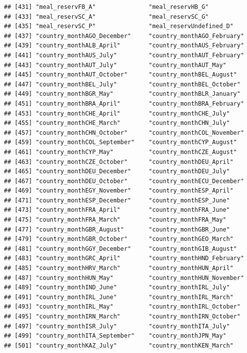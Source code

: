 \documentclass[
]{article}
\begin{document}
\begin{verbatim}
## [431] "meal_reservFB_A"               "meal_reservHB_G"              
## [433] "meal_reservSC_A"               "meal_reservSC_G"              
## [435] "meal_reservSC_P"               "meal_reservUndefined_D"       
## [437] "country_monthAGO_December"     "country_monthAGO_February"    
## [439] "country_monthALB_April"        "country_monthAUS_February"    
## [441] "country_monthAUS_July"         "country_monthAUT_February"    
## [443] "country_monthAUT_July"         "country_monthAUT_May"         
## [445] "country_monthAUT_October"      "country_monthBEL_August"      
## [447] "country_monthBEL_July"         "country_monthBEL_October"     
## [449] "country_monthBGR_May"          "country_monthBLR_January"     
## [451] "country_monthBRA_April"        "country_monthBRA_February"    
## [453] "country_monthCHE_April"        "country_monthCHE_July"        
## [455] "country_monthCHE_March"        "country_monthCHN_July"        
## [457] "country_monthCHN_October"      "country_monthCOL_November"    
## [459] "country_monthCOL_September"    "country_monthCYP_August"      
## [461] "country_monthCYP_May"          "country_monthCZE_August"      
## [463] "country_monthCZE_October"      "country_monthDEU_April"       
## [465] "country_monthDEU_December"     "country_monthDEU_July"        
## [467] "country_monthDEU_October"      "country_monthECU_December"    
## [469] "country_monthEGY_November"     "country_monthESP_April"       
## [471] "country_monthESP_December"     "country_monthESP_June"        
## [473] "country_monthFRA_April"        "country_monthFRA_June"        
## [475] "country_monthFRA_March"        "country_monthFRA_May"         
## [477] "country_monthGBR_August"       "country_monthGBR_June"        
## [479] "country_monthGBR_October"      "country_monthGEO_March"       
## [481] "country_monthGGY_December"     "country_monthGIB_August"      
## [483] "country_monthGRC_April"        "country_monthHND_February"    
## [485] "country_monthHRV_March"        "country_monthHUN_April"       
## [487] "country_monthHUN_May"          "country_monthHUN_November"    
## [489] "country_monthIND_June"         "country_monthIRL_July"        
## [491] "country_monthIRL_June"         "country_monthIRL_March"       
## [493] "country_monthIRL_May"          "country_monthIRL_October"     
## [495] "country_monthIRN_March"        "country_monthIRN_October"     
## [497] "country_monthISR_July"         "country_monthITA_July"        
## [499] "country_monthITA_September"    "country_monthJPN_May"         
## [501] "country_monthKAZ_July"         "country_monthKEN_March"       

\end{verbatim}
\end{document}
